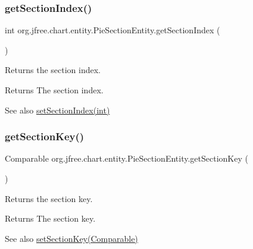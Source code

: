 \subsubsection{\texorpdfstring{get\+Section\+Index()}{getSectionIndex()}}
{\footnotesize\ttfamily int org.\+jfree.\+chart.\+entity.\+Pie\+Section\+Entity.\+get\+Section\+Index (\begin{DoxyParamCaption}{ }\end{DoxyParamCaption})}

Returns the section index.

\begin{DoxyReturn}{Returns}
The section index.
\end{DoxyReturn}
\begin{DoxySeeAlso}{See also}
\mbox{\hyperlink{classorg_1_1jfree_1_1chart_1_1entity_1_1_pie_section_entity_a006645185ce6fea9502b49b823431307}{set\+Section\+Index(int)}} 
\end{DoxySeeAlso}
\mbox{\label{classorg_1_1jfree_1_1chart_1_1entity_1_1_pie_section_entity_ac1c641ae979fd28641726ab3a93bd443}} 
\subsubsection{\texorpdfstring{get\+Section\+Key()}{getSectionKey()}}
{\footnotesize\ttfamily Comparable org.\+jfree.\+chart.\+entity.\+Pie\+Section\+Entity.\+get\+Section\+Key (\begin{DoxyParamCaption}{ }\end{DoxyParamCaption})}

Returns the section key.

\begin{DoxyReturn}{Returns}
The section key.
\end{DoxyReturn}
\begin{DoxySeeAlso}{See also}
\mbox{\hyperlink{classorg_1_1jfree_1_1chart_1_1entity_1_1_pie_section_entity_af1335031bd29163a4d65ee4e02a044cd}{set\+Section\+Key(\+Comparable)}} 
\end{DoxySeeAlso}
\mbox{\label{classorg_1_1jfree_1_1chart_1_1entity_1_1_pie_section_entity_a16f9329941bd0c821bbdae7677e61d90}} 

